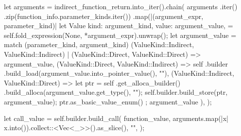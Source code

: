 \documentclass[
  oneside,
  english,
  coorientadorbanca,
  noabntexcite
]{ufsc-thesis-rn46-2019}
\begin{document}
\begin{rustcode}
{{{{                let arguments = indirect_function_return.into_iter().chain(
                    arguments
                        .iter()
                        .zip(function_info.parameter_kinds.iter())
                        .map(|(argument_expr, parameter_kind)| {
                            let Value {
                                kind: argument_kind,
                                value: argument_value,
                            } = self.fold_expression(None, *argument_expr).unwrap();
                            let argument_value = match (parameter_kind, argument_kind) {
                                (ValueKind::Indirect, ValueKind::Indirect)
                                | (ValueKind::Direct, ValueKind::Direct) => argument_value,
                                (ValueKind::Direct, ValueKind::Indirect) => self
                                    .builder
                                    .build_load(argument_value.into_pointer_value(), ""),
                                (ValueKind::Indirect, ValueKind::Direct) => {
                                    let ptr = self
                                        .get_alloca_builder()
                                        .build_alloca(argument_value.get_type(), "");
                                    self.builder.build_store(ptr, argument_value);
                                    ptr.as_basic_value_enum()
                                }
                            };
                            argument_value
                        }),
                );

                let call_value = self.builder.build_call(
                    function_value,
                    arguments.map(|x| x.into()).collect::<Vec<_>>().as_slice(),
                    "",
                );

}}}}
\end{rustcode}
\end{document}
